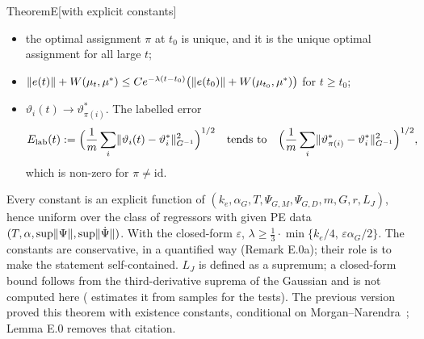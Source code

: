 \begin{thm}{Theorem}{E}[with explicit constants]
\begin{itemize}
  \item the optimal assignment $\pi$ at $t_0$ is unique, and it is the unique optimal assignment for all large $t$;
  \item $\lVert e(t)\rVert+W(\mu_t,\mu^*)\le Ce^{-\lambda(t-t_0)}\bigl(\lVert e(t_0)\rVert+W(\mu_{t_0},\mu^*)\bigr)$ for
    $t\ge t_0$;
  \item $\vartheta_i(t)\to\vartheta^*_{\pi(i)}$. The labelled error
    \[
      E_{\mathrm{lab}}(t):=\Bigl(\frac1m\sum_i\lVert \vartheta_i(t)-\vartheta^*_i\rVert^2_{G^{-1}}\Bigr)^{1/2}
      \quad\text{tends to}\quad
      \Bigl(\frac1m\sum_i\lVert \vartheta^*_{\pi(i)}-\vartheta^*_i\rVert^2_{G^{-1}}\Bigr)^{1/2},
    \]
    which is non-zero for $\pi\neq\mathrm{id}$.
\end{itemize}
Every constant is an explicit function of $(k_e,\alpha_G,T,\Psi_{G,M},\Psi_{G,D},m,G,r,L_J)$, hence uniform over the
class of regressors with given PE data $(T,\alpha,\sup\lVert \Psi\rVert,\sup\lVert \dot\Psi\rVert)$. With the closed-form
$\varepsilon$, $\lambda\ge\frac13\cdot\min\{k_e/4,\,\varepsilon\alpha_G/2\}$. The constants are conservative, in a
quantified way (Remark E.0a); their role is to make the statement self-contained. $L_J$ is defined as a supremum; a
closed-form bound follows from the third-derivative suprema of the Gaussian and is not computed here
( estimates it from samples for the tests). The previous version proved
this theorem with existence constants, conditional on Morgan--Narendra~\cite[Thm.~1]{S8}; Lemma E.0 removes that
citation.
\end{thm}

